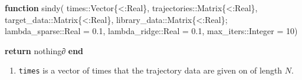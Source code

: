 \documentclass[
]{article}
\newenvironment{Shaded}{\begin{snugshade}}{\end{snugshade}}
\newcommand{\ControlFlowTok}[1]{\textcolor[rgb]{0.00,0.23,0.31}{\textbf{#1}}}
\newcommand{\DataTypeTok}[1]{\textcolor[rgb]{0.68,0.00,0.00}{#1}}
\newcommand{\FloatTok}[1]{\textcolor[rgb]{0.68,0.00,0.00}{#1}}
\newcommand{\FunctionTok}[1]{\textcolor[rgb]{0.28,0.35,0.67}{#1}}
\newcommand{\KeywordTok}[1]{\textcolor[rgb]{0.00,0.23,0.31}{\textbf{#1}}}
\newcommand{\NormalTok}[1]{\textcolor[rgb]{0.00,0.23,0.31}{#1}}
\newcommand{\OperatorTok}[1]{\textcolor[rgb]{0.37,0.37,0.37}{#1}}
\providecommand{\tightlist}{%
  \setlength{\itemsep}{0pt}\setlength{\parskip}{0pt}}\usepackage{longtable,booktabs,array}
\begin{document}
\begin{tcolorbox}[enhanced jigsaw, toprule=.15mm, coltitle=black, leftrule=.75mm, opacityback=0, breakable, colframe=quarto-callout-tip-color-frame, opacitybacktitle=0.6, titlerule=0mm, colbacktitle=quarto-callout-tip-color!10!white, colback=white, rightrule=.15mm, left=2mm, arc=.35mm, toptitle=1mm, title={SINDy {[}standard{]} (Julia implementation)}, bottomtitle=1mm, bottomrule=.15mm]

\begin{Shaded}
\begin{Highlighting}[]
\KeywordTok{function} \FunctionTok{sindy}\NormalTok{(}
\NormalTok{  times}\OperatorTok{::}\DataTypeTok{Vector\{\textless{}:Real\}}\NormalTok{,}
\NormalTok{  trajectories}\OperatorTok{::}\DataTypeTok{Matrix\{\textless{}:Real\}}\NormalTok{,}
\NormalTok{  target\_data}\OperatorTok{::}\DataTypeTok{Matrix\{\textless{}:Real\}}\NormalTok{, }
\NormalTok{  library\_data}\OperatorTok{::}\DataTypeTok{Matrix\{\textless{}:Real\}}\NormalTok{; }
\NormalTok{  lambda\_sparse}\OperatorTok{::}\DataTypeTok{Real }\OperatorTok{=} \FloatTok{0.1}\NormalTok{,}
\NormalTok{  lambda\_ridge}\OperatorTok{::}\DataTypeTok{Real }\OperatorTok{=} \FloatTok{0.1}\NormalTok{,}
\NormalTok{  max\_iters}\OperatorTok{::}\DataTypeTok{Integer }\OperatorTok{=} \FloatTok{10}\NormalTok{)}

  \ControlFlowTok{return}\NormalTok{ nothing∂}
\KeywordTok{end}
\end{Highlighting}
\end{Shaded}

\begin{enumerate}
\def\labelenumi{\arabic{enumi}.}
\tightlist
\item
  \texttt{times} is a vector of times that the trajectory data are given
  on of length \(N\).
\end{enumerate}

\end{tcolorbox}
\end{document}
